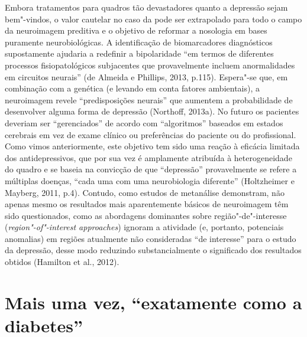Embora tratamentos para quadros tão devastadores quanto a depressão
sejam bem"-vindos, o valor cautelar no caso da  pode ser extrapolado
para todo o campo da neuroimagem preditiva e o objetivo de reformar a
nosologia em bases puramente neurobiológicas. A identificação de
biomarcadores diagnósticos supostamente ajudaria a redefinir a
bipolaridade ``em termos de diferentes processos fisiopatológicos
subjacentes que provavelmente incluem anormalidades em circuitos
neurais'' (de Almeida e Phillips, 2013, p.115). Espera"-se que, em
combinação com a genética (e levando em conta fatores ambientais), a
neuroimagem revele ``predisposições neurais'' que aumentem a
probabilidade de desenvolver alguma forma de depressão (Northoff,
2013a). No futuro os pacientes deveriam ser ``gerenciados'' de acordo
com ``algoritmos'' baseados em estados cerebrais em vez de exame clínico
ou preferências do paciente ou do profissional. Como vimos
anteriormente, este objetivo tem sido uma reação à eficácia limitada dos
antidepressivos, que por sua vez é amplamente atribuída à
heterogeneidade do quadro e se baseia na convicção de que ``depressão''
provavelmente se refere a múltiplas doenças, ``cada uma com uma
neurobiologia diferente'' (Holtzheimer e Mayberg, 2011, p.4). Contudo,
como estudos de metanálise demonstram, não apenas mesmo os resultados
mais aparentemente básicos de neuroimagem têm sido questionados, como as
abordagens dominantes sobre região"-de"-interesse
(\emph{region"-of"-interest approaches}) ignoram a atividade (e, portanto,
potenciais anomalias) em regiões atualmente não consideradas ``de
interesse'' para o estudo da depressão, desse modo reduzindo
substancialmente o significado dos resultados obtidos (Hamilton et al.,
2012).

\chapter{Mais uma vez, ``exatamente como a diabetes''}

